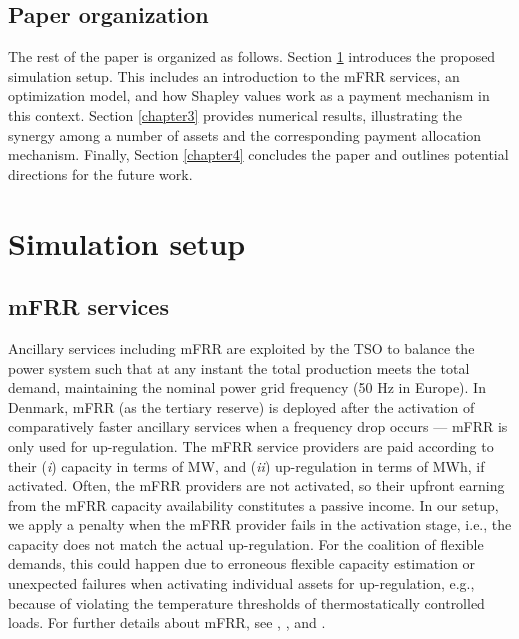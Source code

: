 \documentclass[conference]{IEEEtran}
\begin{document}
\vspace{0mm}
\subsection{Paper organization}
\vspace{-1mm}
The rest of the paper is organized as follows.
Section \ref{chapter2} introduces the proposed simulation setup. This includes an introduction to the mFRR services, an optimization model, and how Shapley values work as a payment mechanism in this context. Section \ref{chapter3} provides numerical results, illustrating the synergy among a number of assets and the corresponding payment allocation mechanism. Finally, Section \ref{chapter4} concludes the paper and outlines  potential directions for the future work.

\section{Simulation setup}
\label{chapter2}

\subsection{mFRR services}\label{sec:mFRR}
%
Ancillary services including mFRR are exploited by the TSO to balance the power system such that at any instant the total production meets the total demand, maintaining the nominal power grid frequency (50 Hz in Europe). In Denmark, mFRR (as the tertiary reserve) is deployed after the activation of comparatively faster ancillary services when a frequency drop occurs --- mFRR is only used for up-regulation. The mFRR service providers are paid according to their (\textit{i}) capacity in terms of MW, and (\textit{ii}) up-regulation in terms of MWh, if activated. Often, the mFRR providers are not activated, so their upfront earning from the mFRR capacity availability constitutes a passive income. In our setup, we apply a penalty when the mFRR provider fails in the activation stage, i.e., the capacity does not match the actual up-regulation. For the coalition of flexible demands, this could happen  due to erroneous  flexible capacity estimation or unexpected failures when activating individual assets for up-regulation, e.g.,  because of violating the temperature thresholds of thermostatically controlled loads. %
For further details about mFRR, see  \cite{energinet:prequalification}, \cite{energinet:Systemydelser}, and \cite{energinet:tender_conditions_reserves}.
\end{document}
